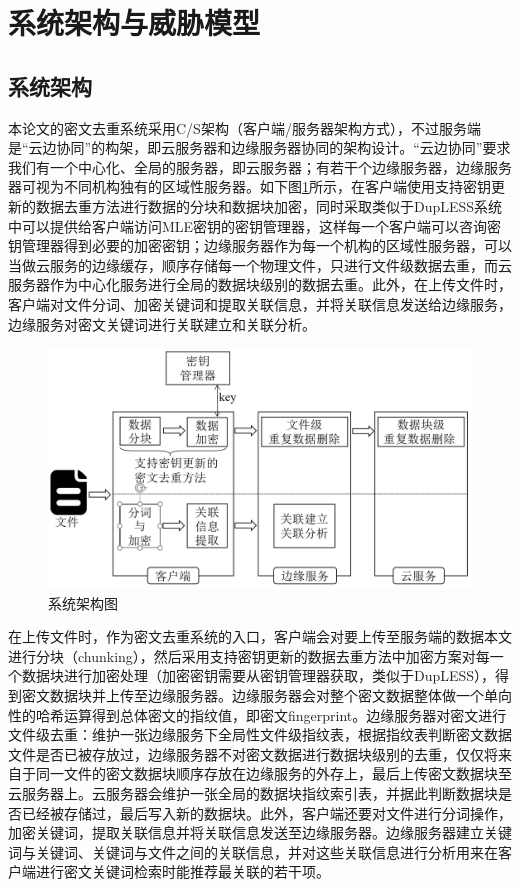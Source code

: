 \documentclass[promaster]{thesis-uestc}
\begin{document}
\section{系统架构与威胁模型}
\subsection{系统架构}\label{系统架构}
本论文的密文去重系统采用C/S架构（客户端/服务器架构方式），不过服务端是“云边协同”的构架，即云服务器和边缘服务器协同的架构设计。“云边协同”要求我们有一个中心化、全局的服务器，即云服务器；有若干个边缘服务器，边缘服务器可视为不同机构独有的区域性服务器。如下图\ref{系统架构图}所示，在客户端使用支持密钥更新的数据去重方法进行数据的分块和数据块加密，同时采取类似于DupLESS系统中可以提供给客户端访问MLE密钥的密钥管理器，这样每一个客户端可以咨询密钥管理器得到必要的加密密钥；边缘服务器作为每一个机构的区域性服务器，可以当做云服务的边缘缓存，顺序存储每一个物理文件，只进行文件级数据去重，而云服务器作为中心化服务进行全局的数据块级别的数据去重。此外，在上传文件时，客户端对文件分词、加密关键词和提取关联信息，并将关联信息发送给边缘服务，边缘服务对密文关键词进行关联建立和关联分析。

\begin{figure}[htbp]
    \centering
    \includegraphics[width = 1.0\linewidth]{pic/jiagoutu.png}
    \caption{系统架构图}
    \label{系统架构图}
\end{figure}

在上传文件时，作为密文去重系统的入口，客户端会对要上传至服务端的数据本文进行分块（chunking），然后采用支持密钥更新的数据去重方法中加密方案对每一个数据块进行加密处理（加密密钥需要从密钥管理器获取，类似于DupLESS），得到密文数据块并上传至边缘服务器。边缘服务器会对整个密文数据整体做一个单向性的哈希运算得到总体密文的指纹值，即密文fingerprint。边缘服务器对密文进行文件级去重：维护一张边缘服务下全局性文件级指纹表，根据指纹表判断密文数据文件是否已被存放过，边缘服务器不对密文数据进行数据块级别的去重，仅仅将来自于同一文件的密文数据块顺序存放在边缘服务的外存上，最后上传密文数据块至云服务器上。云服务器会维护一张全局的数据块指纹索引表，并据此判断数据块是否已经被存储过，最后写入新的数据块。此外，客户端还要对文件进行分词操作，加密关键词，提取关联信息并将关联信息发送至边缘服务器。边缘服务器建立关键词与关键词、关键词与文件之间的关联信息，并对这些关联信息进行分析用来在客户端进行密文关键词检索时能推荐最关联的若干项。
\end{document}
